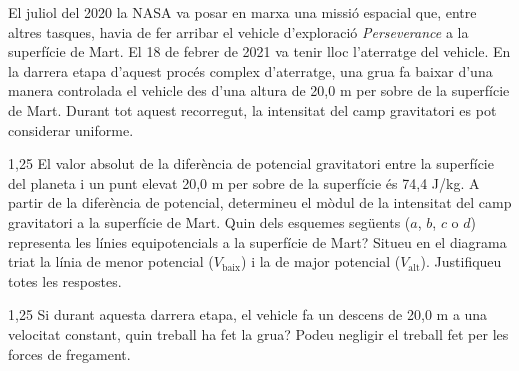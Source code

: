 El juliol del 2020 la NASA va posar en marxa una missió espacial que, entre altres tasques, havia de fer arribar el vehicle d'exploració \textit{Perseverance} a la superfície de Mart. El 18 de febrer de 2021 va tenir lloc l'aterratge del vehicle. En la darrera etapa d'aquest procés complex d'aterratge, una grua fa baixar d'una manera controlada el vehicle des d'una altura de 20,0 m per sobre de la superfície de Mart. Durant tot aquest recorregut, la intensitat del camp gravitatori es pot considerar uniforme.

\begin{apartat}{1,25}
El valor absolut de la diferència de potencial gravitatori entre la superfície del planeta i un punt elevat 20,0 m per sobre de la superfície és 74,4 J/kg. A partir de la diferència de potencial, determineu el mòdul de la intensitat del camp gravitatori a la superfície de Mart. Quin dels esquemes següents ($a$, $b$, $c$ o $d$) representa les línies equipotencials a la superfície de Mart? Situeu en el diagrama triat la línia de menor potencial ($V_\mathrm{baix}$) i la de major potencial ($V_\mathrm{alt}$). Justifiqueu totes les respostes.

\end{apartat}

\begin{apartat}{1,25}
Si durant aquesta darrera etapa, el vehicle fa un descens de 20,0 m a una velocitat constant, quin treball ha fet la grua? Podeu negligir el treball fet per les forces de fregament.
\end{apartat}

